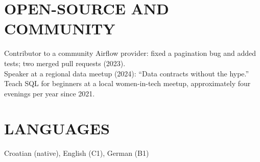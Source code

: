 \documentclass[11pt,a4paper]{article}
\begin{document}
\section*{OPEN-SOURCE AND COMMUNITY}
Contributor to a community Airflow provider: fixed a pagination bug and added tests; two merged pull requests (2023).\\
Speaker at a regional data meetup (2024): ``Data contracts without the hype.''\\
Teach SQL for beginners at a local women-in-tech meetup, approximately four evenings per year since 2021.

\section*{LANGUAGES}
Croatian (native), English (C1), German (B1)
\end{document}
